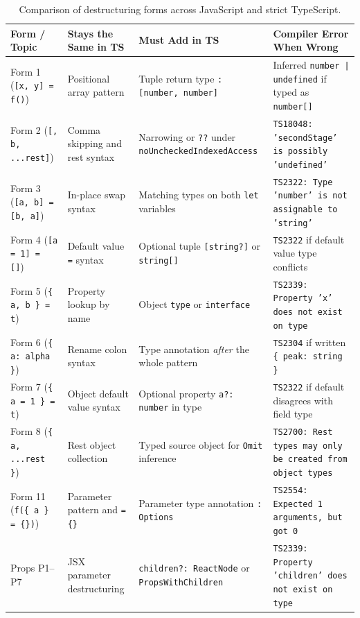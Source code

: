 \documentclass[11pt, a4paper]{article}
\begin{document}
\begin{table}[ht]
\centering
\caption{Comparison of destructuring forms across JavaScript and strict TypeScript.}
\label{tab:jsvsts}
\begin{tabularx}{\textwidth}{l X X X}
\toprule
\textbf{Form / Topic} & \textbf{Stays the Same in TS} & \textbf{Must Add in TS} & \textbf{Compiler Error When Wrong} \\
\midrule
Form 1 (\texttt{[x, y] = f()}) & Positional array pattern & Tuple return type \texttt{: [number, number]} & Inferred \texttt{number | undefined} if typed as \texttt{number[]} \\
Form 2 (\texttt{[, b, ...rest]}) & Comma skipping and rest syntax & Narrowing or \texttt{??} under \texttt{noUncheckedIndexedAccess} & \texttt{TS18048: 'secondStage' is possibly 'undefined'} \\
Form 3 (\texttt{[a, b] = [b, a]}) & In-place swap syntax & Matching types on both \texttt{let} variables & \texttt{TS2322: Type 'number' is not assignable to 'string'} \\
Form 4 (\texttt{[a = 1] = []}) & Default value \texttt{=} syntax & Optional tuple \texttt{[string?]} or \texttt{string[]} & \texttt{TS2322} if default value type conflicts \\
Form 5 (\texttt{\{ a, b \} = t}) & Property lookup by name & Object \texttt{type} or \texttt{interface} & \texttt{TS2339: Property 'x' does not exist on type} \\
Form 6 (\texttt{\{ a: alpha \}}) & Rename colon syntax & Type annotation \emph{after} the whole pattern & \texttt{TS2304} if written \texttt{\{ peak: string \}} \\
Form 7 (\texttt{\{ a = 1 \} = t}) & Object default value syntax & Optional property \texttt{a?: number} in type & \texttt{TS2322} if default disagrees with field type \\
Form 8 (\texttt{\{ a, ...rest \}}) & Rest object collection & Typed source object for \texttt{Omit} inference & \texttt{TS2700: Rest types may only be created from object types} \\
Form 11 (\texttt{f(\{ a \} = \{\})}) & Parameter pattern and \texttt{= \{\}} & Parameter type annotation \texttt{: Options} & \texttt{TS2554: Expected 1 arguments, but got 0} \\
Props P1--P7 & JSX parameter destructuring & \texttt{children?: ReactNode} or \texttt{PropsWithChildren} & \texttt{TS2339: Property 'children' does not exist on type} \\
\bottomrule
\end{tabularx}
\end{table}
\end{document}
